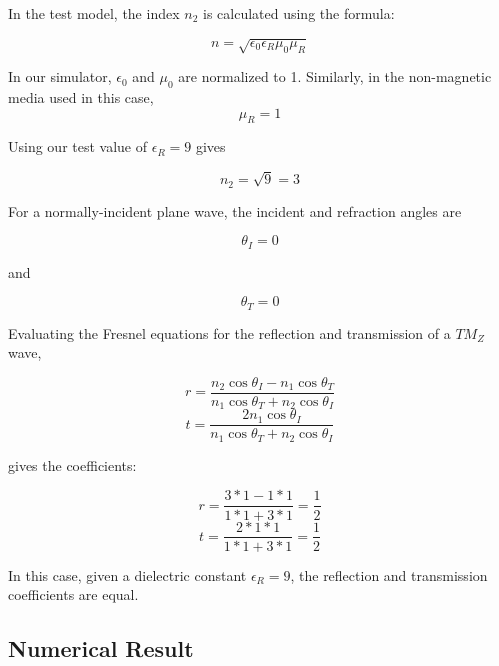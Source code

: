 In the test model, the index $n_2$ is calculated using the formula:

\begin{equation}
n = \sqrt{\epsilon_0 \epsilon_R \mu_0 \mu_R}
\end{equation}

In our simulator, $\epsilon_0$ and $\mu_0$ are normalized to 1. Similarly, in the non-magnetic media used in this case, 
\begin{equation}
\mu_R = 1
\end{equation}

Using our test value of $\epsilon_R = 9$ gives 

\begin{equation}
n_2 = \sqrt{9} = 3
\end{equation}

\clearpage

For a normally-incident plane wave, the incident and refraction angles are

\begin{equation}
\theta_I = 0
\end{equation}

and

\begin{equation}
\theta_T = 0
\end{equation}

Evaluating the Fresnel equations for the reflection and transmission of a $TM_Z$ wave,

\begin{equation}
r = \frac{n_2 \cos \theta_I - n_1 \cos \theta_T}{n_1 \cos \theta_T + n_2 \cos \theta_I}
\end{equation}
\begin{equation}
t = \frac{2 n_1 \cos \theta_I}{n_1 \cos \theta_T + n_2 \cos \theta_I}
\end{equation}

gives the coefficients:

\begin{equation}
r = \frac{3 * 1- 1 * 1}{1 * 1 + 3 * 1} = \frac{1}{2}
\end{equation}
\begin{equation}
t = \frac{2 * 1 * 1}{1 * 1 + 3 * 1} = \frac{1}{2}
\end{equation}

In this case, given a dielectric constant $\epsilon_R  = 9$, the reflection and transmission coefficients are equal.

\subsection{Numerical Result}

